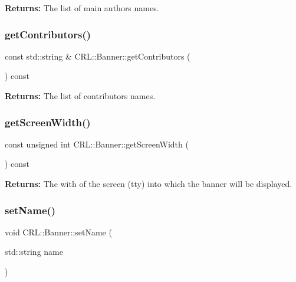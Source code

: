 {\bfseries Returns\+:} The list of main author\textquotesingle{}s names. \mbox{\label{classCRL_1_1Banner_aded1fb7c4ffd107c27b266287b1db0d2}} 
\subsubsection{\texorpdfstring{get\+Contributors()}{getContributors()}}
{\footnotesize\ttfamily const std\+::string \& C\+R\+L\+::\+Banner\+::get\+Contributors (\begin{DoxyParamCaption}{ }\end{DoxyParamCaption}) const\hspace{0.3cm}{\ttfamily [inline]}}

{\bfseries Returns\+:} The list of contributor\textquotesingle{}s names. \mbox{\label{classCRL_1_1Banner_af956943247d260a3ba9a9f9a696695dd}} 
\subsubsection{\texorpdfstring{get\+Screen\+Width()}{getScreenWidth()}}
{\footnotesize\ttfamily const unsigned int C\+R\+L\+::\+Banner\+::get\+Screen\+Width (\begin{DoxyParamCaption}{ }\end{DoxyParamCaption}) const\hspace{0.3cm}{\ttfamily [inline]}}

{\bfseries Returns\+:} The with of the screen (tty) into which the banner will be displayed. \mbox{\label{classCRL_1_1Banner_af9e99981d33eb609a1b8a9d2f36db7ee}} 
\subsubsection{\texorpdfstring{set\+Name()}{setName()}}
{\footnotesize\ttfamily void C\+R\+L\+::\+Banner\+::set\+Name (\begin{DoxyParamCaption}\item[{std\+::string}]{name }\end{DoxyParamCaption})}

